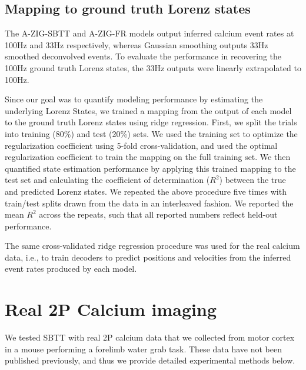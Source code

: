 \documentclass{article}
\begin{document}
\subsection{Mapping to ground truth Lorenz states}
\label{section: lorenz_mapping}

The A-ZIG-SBTT and A-ZIG-FR models output inferred calcium event rates at 100Hz and 33Hz respectively, whereas Gaussian smoothing outputs 33Hz smoothed deconvolved events. To evaluate the performance in recovering the 100Hz ground truth Lorenz states, the 33Hz outputs were linearly extrapolated to 100Hz. 

Since our goal was to quantify modeling performance by estimating the underlying Lorenz States, we trained a mapping from the output of each model to the ground truth Lorenz states using ridge regression. First, we split the trials into training (80\%) and test (20\%) sets.  We used the training set to optimize the regularization coefficient using 5-fold cross-validation, and used the optimal regularization coefficient to train the mapping on the full training set. We then quantified state estimation performance by applying this trained mapping to the test set and calculating the coefficient of determination ($R^2$) between the true and predicted Lorenz states. We repeated the above procedure five times with train/test splits drawn from the data in an interleaved fashion. We reported the mean $R^2$ across the repeats, such that all reported numbers reflect held-out performance. 

The same cross-validated ridge regression procedure was used for the real calcium data, i.e., to train decoders to predict positions and velocities from the inferred event rates produced by each model.

\section{Real 2P Calcium imaging}

We tested SBTT with real 2P calcium data that we collected from motor cortex in a mouse performing a forelimb water grab task. These data have not been published previously, and thus we provide detailed experimental methods below.
\end{document}

